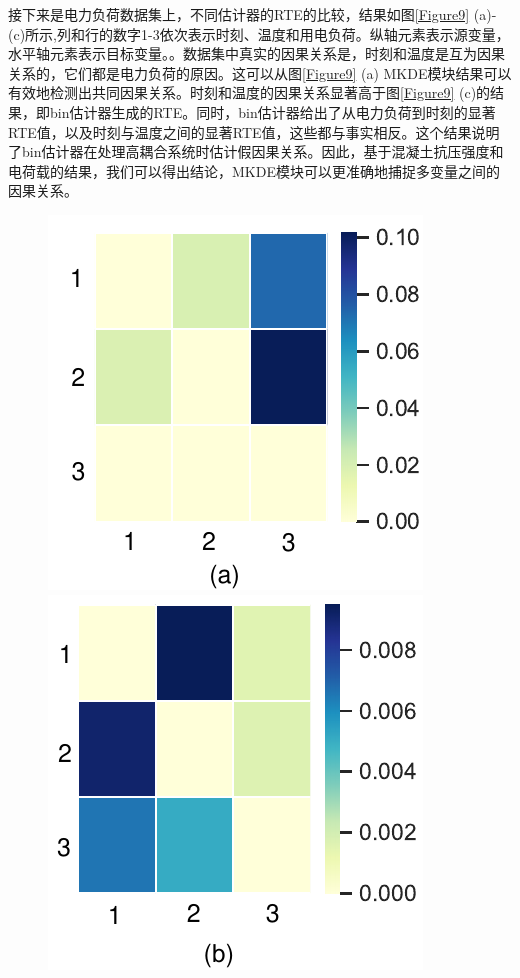 接下来是电力负荷数据集上，不同估计器的RTE的比较，结果如图\ref{Figure9} (a)-(c)所示,列和行的数字1-3依次表示时刻、温度和用电负荷。纵轴元素表示源变量，水平轴元素表示目标变量。。数据集中真实的因果关系是，时刻和温度是互为因果关系的，它们都是电力负荷的原因。这可以从图\ref{Figure9} (a) MKDE模块结果可以有效地检测出共同因果关系。时刻和温度的因果关系显著高于图\ref{Figure9} (c)的结果，即bin估计器生成的RTE。同时，bin估计器给出了从电力负荷到时刻的显著RTE值，以及时刻与温度之间的显著RTE值，这些都与事实相反。这个结果说明了bin估计器在处理高耦合系统时估计假因果关系。因此，基于混凝土抗压强度和电荷载的结果，我们可以得出结论，MKDE模块可以更准确地捕捉多变量之间的因果关系。
\begin{figure}[!ht]
\begin{center}
\includegraphics[scale=0.5]{./ch3/fig3_12.pdf}
\includegraphics[scale=0.5]{./ch3/fig3_13.pdf}

\end{center}
\end{figure}
